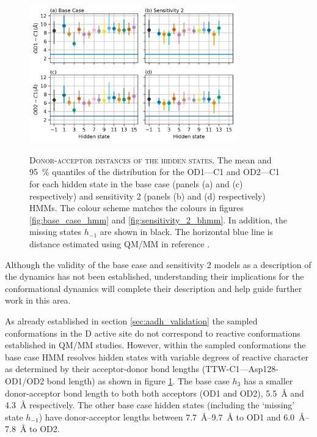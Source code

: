\begin{figure}
    \centering
    \caption[Donor-acceptor distances of the hidden states]{\textsc{Donor-acceptor distances of the hidden states}. The mean and \SI{95}{\percent} quantiles of the distribution for the OD1---C1 and OD2---C1  for each hidden state in the base case (panels (a) and (c) respectively) and sensitivity 2 (panels (b) and (d) respectively) HMMs. The colour scheme matches the colours in figures \ref{fig:base_case_hmm} and \ref{fig:sensitivity_2_bhmm}. In addition, the missing states $h_{-1}$ are shown in black. The horizontal blue line is distance estimated using QM/MM in reference \cite{ranaghanInitioQMMM2017}.}
    \includegraphics[width=0.8\textwidth]{chapters/aadh/figures/bond_dist_h_states.png}
    \label{fig:addh_bond_dist_h_state}
\end{figure}

Although the validity of the base case and sensitivity 2 models as a description of the dynamics has not been established, understanding their implications for the conformational dynamics will complete their description and help guide further work in this area. 

As already established in section \ref{sec:aadh_validation} the sampled conformations in the D active site do not correspond to reactive conformations established in QM/MM studies.  However, within the sampled conformations the base case HMM resolves hidden states with variable degrees of reactive character as determined  by their acceptor-donor bond lengths (TTW-C1---Asp128-OD1/OD2 bond length) as shown in figure \ref{fig:addh_bond_dist_h_state}. The base case $h_{3}$ has a smaller donor-acceptor bond length to both both acceptors (OD1 and OD2), \SI{5.5}{\angstrom} and \SI{4.3}{\angstrom} respectively. The other base case hidden states (including the `missing' state $h_{-1}$) have donor-acceptor lengths between \SIrange{7.7}{9.7}{\angstrom} to OD1 and \SIrange{6.0}{7.8}{\angstrom} to OD2. 

